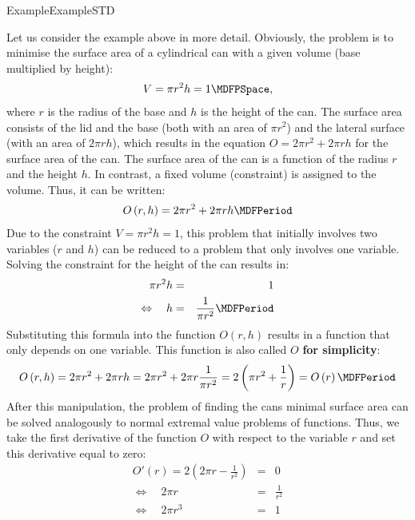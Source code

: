 \begin{MXContent}{Example}{Example}{STD}

Let us consider the example above in more detail. Obviously, the problem is to minimise the 
surface area of a cylindrical can with a given volume (base multiplied by height):
%
\begin{eqnarray*}
V = \pi r^2 h = 1 \MDFPSpace,
\end{eqnarray*}
%
where $r$ is the radius of the base and $h$ is the height of the can. The surface area consists of the 
lid and the base (both with an area of $\pi r^2$) and the lateral surface (with an area of $2 \pi r h$), 
which results in the equation $O = 2 \pi r^2 + 2 \pi r h$ for the surface area of the can. The surface
area of the can is a function of the radius $r$ and the height $h$. In contrast, a fixed volume (constraint) 
is assigned to the volume. Thus, it can be written:
%
\begin{eqnarray*}
O\left(r, h\right) = 2 \pi r^2 + 2 \pi r h \MDFPeriod
\end{eqnarray*}
%
Due to the constraint $V = \pi r^2 h = 1$, this problem that initially involves two variables ($r$ and $h$)
can be reduced to a problem that only involves one variable. Solving the constraint for the height 
of the can results in:
%
\begin{eqnarray*}
\pi r^2 h &=& 1\\
\Leftrightarrow\quad h &=& \frac{1}{\pi r^2} \MDFPeriod
\end{eqnarray*}
%
Substituting this formula into the function $O(r,h)$ results in a function that only depends on one variable. This function 
is also called $O$ \textbf{for simplicity}:
%
\begin{eqnarray*}
O\left(r, h\right) = 2 \pi r^2 + 2 \pi r h = 2 \pi r^2 + 2 \pi r \frac{1}{\pi r^2} = 2 \left(\pi r^2 + \frac{1}{r}\right) = O\left(r\right) \MDFPeriod
\end{eqnarray*}
%
After this manipulation, the problem of finding the cans minimal surface area can be solved analogously 
to normal extremal value problems of functions. Thus, we take the first derivative of the function $O$ with respect to the 
variable $r$ and set this derivative equal to zero:
%
\begin{eqnarray*}
O'\left(r\right) = 2 \left(2\pi r - \frac{1}{r^2}\right) &=& 0\\
\Leftrightarrow\quad 2\pi r &=& \frac{1}{r^2}\\
\Leftrightarrow\quad 2\pi r^3 &=& 1\\

\end{eqnarray*}
\end{MXContent}
